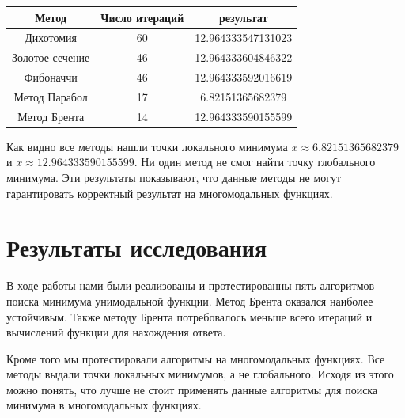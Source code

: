 \documentclass[12pt, a4paper]{article}
\begin{document}
    \begin{table}[h!]
        \begin{center}
            \begin{tabular}{|c c c|}
                \hline

                {Метод}         & Число итераций & результат          \\
                \hline
                Дихотомия       & 60             & 12.964333547131023 \\
                Золотое сечение & 46             & 12.964333604846322 \\
                Фибоначчи       & 46             & 12.964333592016619 \\
                Метод Парабол   & 17             & 6.82151365682379   \\
                Метод Брента    & 14             & 12.964333590155599 \\
                \hline
            \end{tabular}
        \end{center}\label{tab:table}
    \end{table}

    \noindent
    {Как видно все методы нашли точки локального минимума $x \approx 6.82151365682379$ и $x \approx 12.964333590155599$.
    Ни один метод не смог найти точку глобального минимума.
    Эти результаты показывают, что данные методы не могут гарантировать корректный результат на многомодальных функциях.}


    \section{Результаты исследования}\label{sec:результаты-исследования}
    {В ходе работы нами были реализованы и протестированны пять алгоритмов поиска минимума унимодальной функции.
    Метод Брента оказался наиболее устойчивым.
    Также методу Брента потребовалось меньше всего итераций и вычислений функции для нахождения ответа.

    Кроме того мы протестировали алгоритмы на многомодальных функциях.
    Все методы выдали точки локальных минимумов, а не глобального.
    Исходя из этого можно понять, что лучше не стоит применять данные алгоритмы для поиска минимума в многомодальных функциях.}
\end{document}
